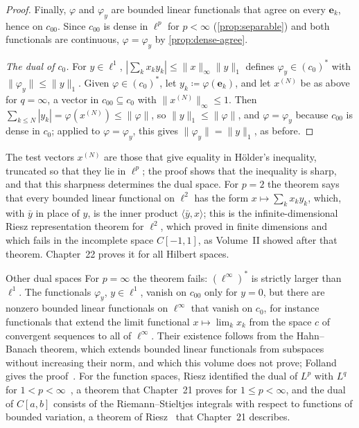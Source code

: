 \begin{proof}
Finally, $\varphi$ and $\varphi_y$ are bounded linear functionals that agree on every $\mathbf e_k$, hence on $c_{00}$. Since $c_{00}$ is dense in $\ell^p$ for $p<\infty$ (\cref{prop:separable}) and both functionals are continuous, $\varphi=\varphi_y$ by \cref{prop:dense-agree}.

\emph{The dual of $c_0$.} For $y\in\ell^1$, $|\sum_kx_ky_k|\le\|x\|_\infty\|y\|_1$ defines $\varphi_y\in(c_0)^*$ with $\|\varphi_y\|\le\|y\|_1$. Given $\varphi\in(c_0)^*$, let $y_k\coloneqq\varphi(\mathbf e_k)$, and let $x^{(N)}$ be as above for $q=\infty$, a vector in $c_{00}\subseteq c_0$ with $\|x^{(N)}\|_\infty\le1$. Then $\sum_{k\le N}|y_k|=\varphi(x^{(N)})\le\|\varphi\|$, so $\|y\|_1\le\|\varphi\|$, and $\varphi=\varphi_y$ because $c_{00}$ is dense in $c_0$; applied to $\varphi=\varphi_y$, this gives $\|\varphi_y\|=\|y\|_1$, as before.
\end{proof}

The test vectors $x^{(N)}$ are those that give equality in H\"older's inequality, truncated so that they lie in $\ell^p$; the proof shows that the inequality is sharp, and that this sharpness determines the dual space. For $p=2$ the theorem says that every bounded linear functional on $\ell^2$ has the form $x\mapsto\sum_kx_ky_k$, which, with $\bar y$ in place of $y$, is the inner product $\langle\bar y,x\rangle$; this is the infinite-dimensional Riesz representation theorem for $\ell^2$, which  proved in finite dimensions and which fails in the incomplete space $C[-1,1]$, as Volume~II showed after that theorem. Chapter~22 proves it for all Hilbert spaces.

\begin{note}{Other dual spaces}
For $p=\infty$ the theorem fails: $(\ell^\infty)^*$ is strictly larger than $\ell^1$. The functionals $\varphi_y$, $y\in\ell^1$, vanish on $c_{00}$ only for $y=0$, but there are nonzero bounded linear functionals on $\ell^\infty$ that vanish on $c_0$, for instance functionals that extend the limit functional $x\mapsto\lim_kx_k$ from the space $c$ of convergent sequences to all of $\ell^\infty$. Their existence follows from the Hahn--Banach theorem, which extends bounded linear functionals from subspaces without increasing their norm, and which this volume does not prove; Folland gives the proof~\cite[Chap.~5]{folland1999}. For the function spaces, Riesz identified the dual of $L^p$ with $L^q$ for $1<p<\infty$~\cite{riesz1910}, a theorem that Chapter~21 proves for $1\le p<\infty$, and the dual of $C[a,b]$ consists of the Riemann--Stieltjes integrals with respect to functions of bounded variation, a theorem of Riesz~\cite{riesz1909} that Chapter~21 describes.
\end{note}

